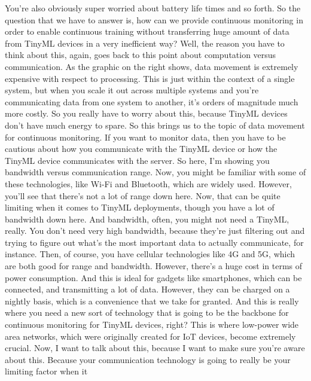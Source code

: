 {{{{{{{{    You're also obviously super worried about battery life times and so forth.
    So the question that we have to answer is,
    how can we provide continuous monitoring in order
    to enable continuous training without transferring huge amount of data
    from TinyML devices in a very inefficient way?
    Well, the reason you have to think about this, again,
    goes back to this point about computation versus communication.
    As the graphic on the right shows, data movement
    is extremely expensive with respect to processing.
    This is just within the context of a single system,
    but when you scale it out across multiple systems
    and you're communicating data from one system to another,
    it's orders of magnitude much more costly.
    So you really have to worry about this, because TinyML devices
    don't have much energy to spare.
    So this brings us to the topic of data movement for continuous monitoring.
    If you want to monitor data, then you have
    to be cautious about how you communicate with the TinyML device
    or how the TinyML device communicates with the server.
    So here, I'm showing you bandwidth versus communication range.
    Now, you might be familiar with some of these technologies,
    like Wi-Fi and Bluetooth, which are widely used.
    However, you'll see that there's not a lot of range down here.
    Now, that can be quite limiting when it comes to TinyML deployments,
    though you have a lot of bandwidth down here.
    And bandwidth, often, you might not need a TinyML, really.
    You don't need very high bandwidth, because they're just
    filtering out and trying to figure out what's the most important data
    to actually communicate, for instance.
    Then, of course, you have cellular technologies like 4G and 5G,
    which are both good for range and bandwidth.
    However, there's a huge cost in terms of power consumption.
    And this is ideal for gadgets like smartphones, which can be connected,
    and transmitting a lot of data.
    However, they can be charged on a nightly basis, which is
    a convenience that we take for granted.
    And this is really where you need a new sort of technology that
    is going to be the backbone for continuous monitoring for TinyML
    devices, right?
    This is where low-power wide area networks,
    which were originally created for IoT devices, become extremely crucial.
    Now, I want to talk about this, because I want
    to make sure you're aware about this.
    Because your communication technology is going
    to really be your limiting factor when it
}}}}}}}}
